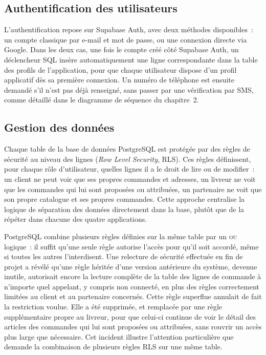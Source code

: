 \documentclass[12pt,fleqn,a4paper]{report}
\begin{document}
\begin{justify}
\subsection{Authentification des utilisateurs}

L'authentification repose sur Supabase Auth, avec deux méthodes disponibles~: un compte classique par e-mail et mot de passe, ou une connexion directe via Google. Dans les deux cas, une fois le compte créé côté Supabase Auth, un déclencheur SQL insère automatiquement une ligne correspondante dans la table des profils de l'application, pour que chaque utilisateur dispose d'un profil applicatif dès sa première connexion. Un numéro de téléphone est ensuite demandé s'il n'est pas déjà renseigné, sans passer par une vérification par SMS, comme détaillé dans le diagramme de séquence du chapitre~2.

\subsection{Gestion des données}

Chaque table de la base de données PostgreSQL est protégée par des règles de sécurité au niveau des lignes (\textit{Row Level Security}, RLS). Ces règles définissent, pour chaque rôle d'utilisateur, quelles lignes il a le droit de lire ou de modifier~: un client ne peut voir que ses propres commandes et adresses, un livreur ne voit que les commandes qui lui sont proposées ou attribuées, un partenaire ne voit que son propre catalogue et ses propres commandes. Cette approche centralise la logique de séparation des données directement dans la base, plutôt que de la répéter dans chacune des quatre applications.

PostgreSQL combine plusieurs règles définies sur la même table par un \textsc{ou} logique~: il suffit qu'une seule règle autorise l'accès pour qu'il soit accordé, même si toutes les autres l'interdisent. Une relecture de sécurité effectuée en fin de projet a révélé qu'une règle héritée d'une version antérieure du système, devenue inutile, autorisait encore la lecture complète de la table des lignes de commande à n'importe quel appelant, y compris non connecté, en plus des règles correctement limitées au client et au partenaire concernés. Cette règle superflue annulait de fait la restriction voulue. Elle a été supprimée, et remplacée par une règle supplémentaire propre au livreur, pour que celui-ci continue de voir le détail des articles des commandes qui lui sont proposées ou attribuées, sans rouvrir un accès plus large que nécessaire. Cet incident illustre l'attention particulière que demande la combinaison de plusieurs règles RLS sur une même table.


\end{justify}
\end{document}
